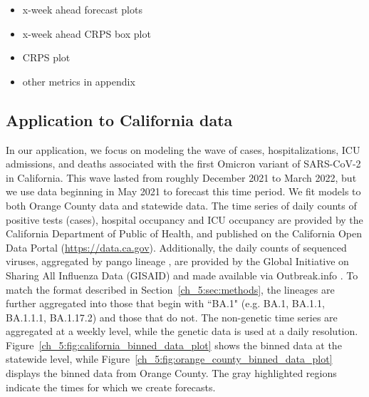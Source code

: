 \begin{itemize}
    \item x-week ahead forecast plots
    
    \item x-week ahead CRPS box plot
    \item CRPS plot
    \item other metrics in appendix
\end{itemize}




\subsection{Application to California data}
\label{ch_5:subsec:application}

In our application, we focus on modeling the wave of cases, hospitalizations, ICU admissions, and deaths associated with the first Omicron variant of SARS-CoV-2 in California.
This wave lasted from roughly December 2021 to March 2022, but we use data beginning in May 2021 to forecast this time period.
We fit models to both Orange County data and statewide data.
The time series of daily counts of positive tests (cases), hospital occupancy and ICU occupancy are provided by the California Department of Public of Health, and published on the California Open Data Portal (\url{https://data.ca.gov}).
Additionally, the daily counts of sequenced viruses, aggregated by pango lineage \citep{pango}, are provided by the Global Initiative on Sharing All Influenza Data (GISAID) \citep{shu2017gisaid} and made available via Outbreak.info \citep{Gangavarapu2023}.
To match the format described in Section~\ref{ch_5:sec:methods}, the lineages are further aggregated into those that begin with ``BA.1" (e.g. BA.1, BA.1.1, BA.1.1.1, BA.1.17.2) and those that do not.
The non-genetic time series are aggregated at a weekly level, while the genetic data is used at a daily resolution.
Figure~\ref{ch_5:fig:california_binned_data_plot} shows the binned data at the statewide level, while Figure~\ref{ch_5:fig:orange_county_binned_data_plot} displays the binned data from Orange County.
The gray highlighted regions indicate the times for which we create forecasts.

